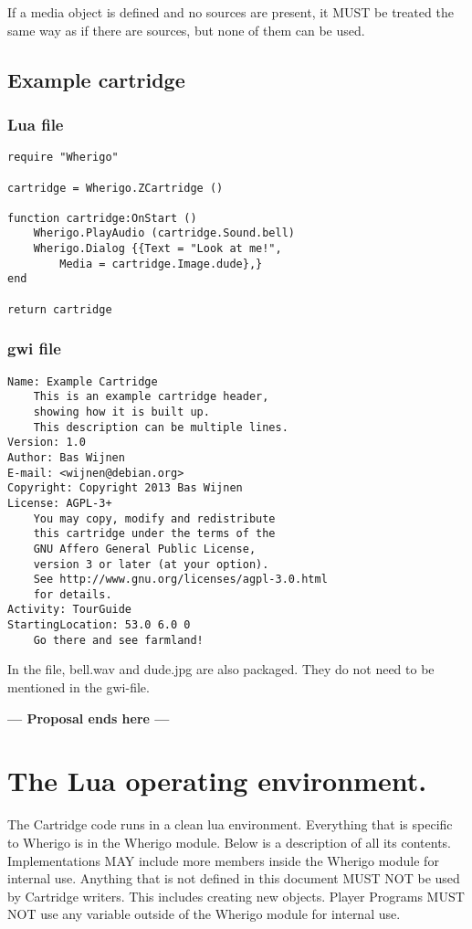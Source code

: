 \documentclass{article}
\begin{document}
If a media object is defined and no sources are present, it MUST be treated the
same way as if there are sources, but none of them can be used.

\subsection{Example cartridge}
\subsubsection{Lua file}
\noindent\begin{lstlisting}
require "Wherigo"

cartridge = Wherigo.ZCartridge ()

function cartridge:OnStart ()
	Wherigo.PlayAudio (cartridge.Sound.bell)
	Wherigo.Dialog {{Text = "Look at me!",
		Media = cartridge.Image.dude},}
end

return cartridge
\end{lstlisting}
\subsubsection{gwi file}
\noindent\begin{lstlisting}
Name: Example Cartridge
	This is an example cartridge header,
	showing how it is built up.
	This description can be multiple lines.
Version: 1.0
Author: Bas Wijnen
E-mail: <wijnen@debian.org>
Copyright: Copyright 2013 Bas Wijnen
License: AGPL-3+
	You may copy, modify and redistribute
	this cartridge under the terms of the
	GNU Affero General Public License,
	version 3 or later (at your option).
	See http://www.gnu.org/licenses/agpl-3.0.html
	for details.
Activity: TourGuide
StartingLocation: 53.0 6.0 0
	Go there and see farmland!
\end{lstlisting}

In the file, bell.wav and dude.jpg are also packaged. They do not need to be
mentioned in the gwi-file.

\noindent\textbf{--- Proposal ends here ---}


\section{The Lua operating environment.}

The Cartridge code runs in a clean lua environment. Everything that is specific
to Wherigo is in the Wherigo module. Below is a description of all its
contents. Implementations MAY include more members inside the Wherigo module
for internal use. Anything that is not defined in this document MUST NOT be
used by Cartridge writers. This includes creating new objects. Player Programs
MUST NOT use any variable outside of the Wherigo module for internal use.
\end{document}
